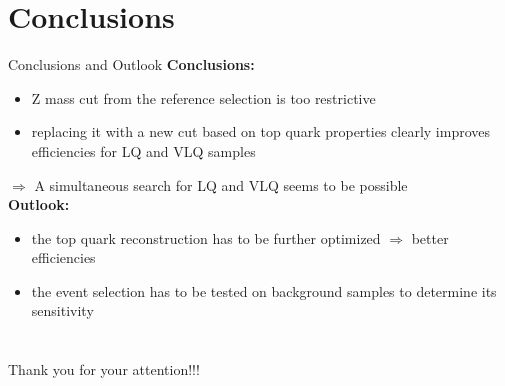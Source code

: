 \documentclass[aspectratio=1610, professionalfonts, 9pt]{beamer}
\begin{document}
\section{Conclusions}
\begin{frame}{Conclusions and Outlook}
  \textbf{Conclusions:}
  \begin{itemize}
    \item Z mass cut from the reference selection is too restrictive
    \item replacing it with a new cut based on top quark properties clearly improves efficiencies for LQ and VLQ samples
  \end{itemize}
  \(\Rightarrow\) A simultaneous search for LQ and VLQ seems to be possible \\
  \vspace{3mm}
  \textbf{Outlook:}
  \begin{itemize}
    \item the top quark reconstruction has to be further optimized \(\Rightarrow\) better efficiencies
    \item the event selection has to be tested on background samples to determine its sensitivity
  \end{itemize}
\end{frame}
\section{}
\begin{frame}
    \Huge Thank you for your attention!!!
\end{frame}
\end{document}

